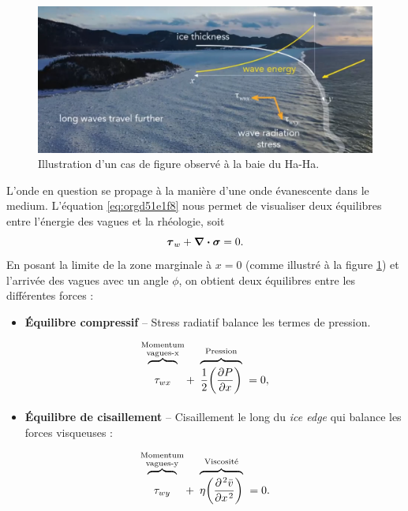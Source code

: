 \documentclass[10pt]{article}
\numberwithin{equation}{section}
\newcommand{\short}{\vphantom{pA}}
\newcommand{\tall}{\vphantom{pA^{x^x}_p}}
\newcommand{\venti}{\vphantom{\sum_x^x}}
\newcommand{\pt}{\hspace{1pt}} %
\begin{document}
\begin{figure}[htbp]
\centering
\includegraphics[width=.9\linewidth]{Figures/photos/glace-evanescente.png}
\caption{\label{fig:org66c73c5}Illustration d'un cas de figure observé à la baie du Ha-Ha.}
\end{figure}

L'onde en question se propage à la manière d'une onde évanescente dans le medium.
L'équation \ref{eq:orgd51e1f8} nous permet de visualiser deux équilibres entre l'énergie des vagues et la rhéologie, soit
\begin{equation}
   \boldsymbol{\tau}_w + \divergence{\boldsymbol{\sigma}} = 0.
\end{equation}
En posant la limite de la zone marginale à \(x=0\) (comme illustré à la figure \ref{fig:org66c73c5}) et l'arrivée des vagues avec un angle \(\phi\), on obtient deux équilibres entre les différentes forces :\bigskip

\begin{itemize}
\item \textbf{Équilibre compressif} -- Stress radiatif balance les termes de pression.
\end{itemize}
\begin{equation}
\label{eq:orgac59b44}
   \overbrace{\venti\phantom{x}\tau_{wx}\phantom{x}}^{\substack{\text{Momentum}\short\\\text{vagues-x}\short}} +\ \overbrace{\venti\frac{1}{2}\qty(\pdv{P}{x})}^{\text{Pression}\tall}\ = 0,
\end{equation}

\begin{itemize}
\item \textbf{Équilibre de cisaillement} -- Cisaillement le long du \emph{ice edge} qui balance les forces visqueuses :
\end{itemize}
\begin{equation}
   \overbrace{\venti\phantom{x}\tau_{wy}\phantom{x}}^{\substack{\text{Momentum}\short\\\text{vagues-y}\short}} +\ \overbrace{\venti\eta\qty(\pdv[\pt2]{\bar{v}}{x})}^{\text{Viscosité}\tall}\ = 0.
\end{equation}
\end{document}
